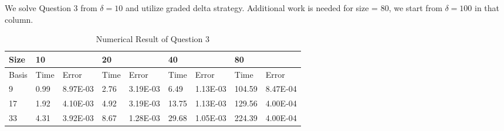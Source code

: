 \documentclass{article}
\begin{document}
We solve Question 3 from $\delta = 10$ and utilize graded delta strategy. Additional work is needed for size = 80, we start from $\delta = 100$ in that column.
\begin{table}[H]
			\centering
	\caption{Numerical Result of Question 3}
	\begin{tabular}{|l|l|l|l|l|l|l|l|l|}
		\hline
		{\color[HTML]{000000} Size}  & \multicolumn{2}{l|}{{\color[HTML]{000000} 10}}                & \multicolumn{2}{l|}{{\color[HTML]{000000} 20}}                & \multicolumn{2}{l|}{{\color[HTML]{000000} 40}}                 & \multicolumn{2}{l|}{{\color[HTML]{000000} 80}}                  \\ \hline
		{\color[HTML]{000000} Basis} & {\color[HTML]{000000} Time} & {\color[HTML]{000000} Error}    & {\color[HTML]{000000} Time} & {\color[HTML]{000000} Error}    & {\color[HTML]{000000} Time}  & {\color[HTML]{000000} Error}    & {\color[HTML]{000000} Time}   & {\color[HTML]{000000} Error}    \\ \hline
		{\color[HTML]{000000} 9}     & {\color[HTML]{000000} 0.99} & {\color[HTML]{000000} 8.97E-03} & {\color[HTML]{000000} 2.76} & {\color[HTML]{000000} 3.19E-03} & {\color[HTML]{000000} 6.49}  & {\color[HTML]{000000} 1.13E-03} & {\color[HTML]{000000} 104.59} & {\color[HTML]{000000} 8.47E-04} \\ \hline
		{\color[HTML]{000000} 17}    & {\color[HTML]{000000} 1.92} & {\color[HTML]{000000} 4.10E-03} & {\color[HTML]{000000} 4.92} & {\color[HTML]{000000} 3.19E-03} & {\color[HTML]{000000} 13.75} & {\color[HTML]{000000} 1.13E-03} & {\color[HTML]{000000} 129.56} & {\color[HTML]{000000} 4.00E-04} \\ \hline
		{\color[HTML]{000000} 33}    & {\color[HTML]{000000} 4.31} & {\color[HTML]{000000} 3.92E-03} & {\color[HTML]{000000} 8.67} & {\color[HTML]{000000} 1.28E-03} & {\color[HTML]{000000} 29.68} & {\color[HTML]{000000} 1.05E-03} & {\color[HTML]{000000} 224.39} & {\color[HTML]{000000} 4.00E-04} \\ \hline
	\end{tabular}
\end{table}
\end{document}

